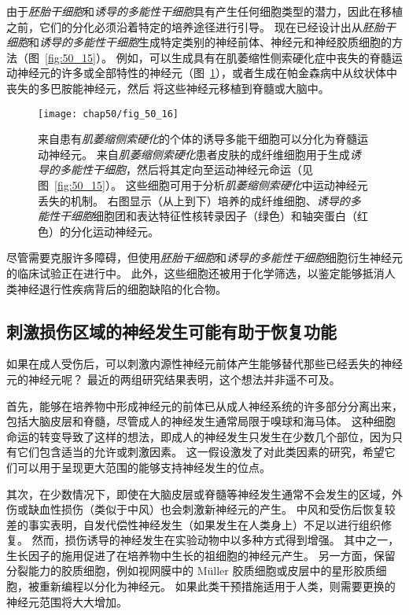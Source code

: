 由于\textit{胚胎干细胞}和\textit{诱导的多能性干细胞}具有产生任何细胞类型的潜力，因此在移植之前，它们的分化必须沿着特定的培养途径进行引导。
现在已经设计出从\textit{胚胎干细胞}和\textit{诱导的多能性干细胞}生成特定类别的神经前体、神经元和神经胶质细胞的方法（图~\ref{fig:50_15}）。
例如，可以生成具有在肌萎缩性侧索硬化症中丧失的脊髓运动神经元的许多或全部特性的神经元（图~\ref{fig:50_16}），或者生成在帕金森病中从纹状体中丧失的多巴胺能神经元，然后 将这些神经元移植到脊髓或大脑中。


\begin{figure}[htbp]
	\centering
	\texttt{[image: chap50/fig\_50\_16]}
	\caption{来自患有\textit{肌萎缩侧索硬化}的个体的诱导多能干细胞可以分化为脊髓运动神经元。
		来自\textit{肌萎缩侧索硬化}患者皮肤的成纤维细胞用于生成\textit{诱导的多能性干细胞}，然后将其定向至运动神经元命运（见图~\ref{fig:50_15}）。
		这些细胞可用于分析\textit{肌萎缩侧索硬化}中运动神经元丢失的机制。
		右图显示（从上到下）培养的成纤维细胞、\textit{诱导的多能性干细胞}细胞团和表达特征性核转录因子（绿色）和轴突蛋白（红色）的分化运动神经元。}
	\label{fig:50_16}
\end{figure}


尽管需要克服许多障碍，但使用\textit{胚胎干细胞}和\textit{诱导的多能性干细胞}细胞衍生神经元的临床试验正在进行中。
此外，这些细胞还被用于化学筛选，以鉴定能够抵消人类神经退行性疾病背后的细胞缺陷的化合物。



\subsection{刺激损伤区域的神经发生可能有助于恢复功能}

如果在成人受伤后，可以刺激内源性神经元前体产生能够替代那些已经丢失的神经元的神经元呢？
最近的两组研究结果表明，这个想法并非遥不可及。


首先，能够在培养物中形成神经元的前体已从成人神经系统的许多部分分离出来，包括大脑皮层和脊髓，尽管成人的神经发生通常局限于嗅球和海马体。
这种细胞命运的转变导致了这样的想法，即成人的神经发生只发生在少数几个部位，因为只有它们包含适当的允许或刺激因素。
这一假设激发了对此类因素的研究，希望它们可以用于呈现更大范围的能够支持神经发生的位点。


其次，在少数情况下，即使在大脑皮层或脊髓等神经发生通常不会发生的区域，外伤或缺血性损伤（类似于中风）也会刺激新神经元的产生。
中风和受伤后恢复较差的事实表明，自发代偿性神经发生（如果发生在人类身上）不足以进行组织修复。
然而，损伤诱导的神经发生在实验动物中以多种方式得到增强。
其中之一，生长因子的施用促进了在培养物中生长的祖细胞的神经元产生。
另一方面，保留分裂能力的胶质细胞，例如视网膜中的 Müller 胶质细胞或皮层中的星形胶质细胞，被重新编程以分化为神经元。
如果此类干预措施适用于人类，则需要更换的神经元范围将大大增加。



